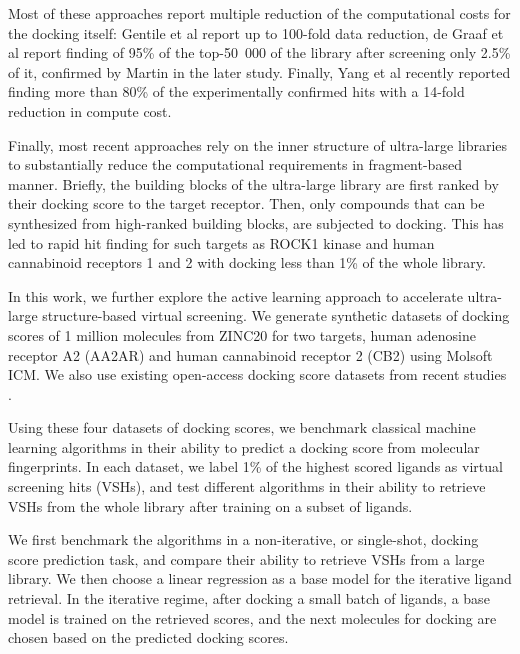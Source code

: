Most of these approaches report multiple reduction of the computational costs for the docking itself: Gentile et al report up to 100-fold data reduction, de Graaf et al report finding of 95\% of the top-50\ 000 of the library after screening only 2.5\% of it, confirmed by Martin \cite{logistic_regression} in the later study. Finally, Yang et al \cite{Yang2021_shoichet_active_learning} recently reported finding more than 80\% of the experimentally confirmed hits with a 14-fold reduction in compute cost.

Finally, most recent approaches \cite{Sadybekov2021_vsynthes,beroza_chemical_2022} rely on the inner structure of ultra-large libraries to substantially reduce the computational requirements in fragment-based manner. Briefly, the building blocks of the ultra-large library are first ranked by their docking score to the target receptor. Then, only compounds that can be synthesized from high-ranked building blocks, are subjected to docking. This has led to rapid hit finding for such targets as ROCK1 kinase and human cannabinoid receptors 1 and 2 with docking less than 1\% of the whole library.

In this work, we further explore the active learning approach to accelerate ultra-large structure-based virtual screening. We generate synthetic datasets of docking scores of 1 million molecules from ZINC20 \cite{Irwin2020ZINC20Discovery} for two targets, human adenosine receptor A2 (AA2AR) and human cannabinoid receptor 2 (CB2) using Molsoft ICM. We also use existing open-access docking score datasets from recent studies \cite{ultralarge_docking_first}. 

Using these four datasets of docking scores, we benchmark classical machine learning algorithms in their ability to predict a docking score from molecular fingerprints. In each dataset, we label 1\% of the highest scored ligands as virtual screening hits (VSHs), and test different algorithms in their ability to retrieve VSHs from the whole library after training on a subset of ligands.

We first benchmark the algorithms in a non-iterative, or single-shot, docking score prediction task, and compare their ability to retrieve VSHs from a large library. We then choose a linear regression as a base model for the iterative ligand retrieval. In the iterative regime, after docking a small batch of ligands, a base model is trained on the retrieved scores, and the next molecules for docking are chosen based on the predicted docking scores.

